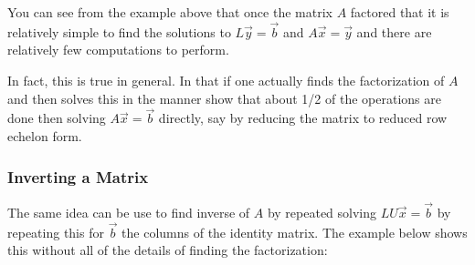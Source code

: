 You can see from the example above that once the matrix $A$ factored that it is relatively simple to find the solutions to $L\vec{y}=\vec{b}$ and $A\vec{x}=\vec{y}$ and there are relatively few computations to perform.  

In fact, this is true in general.  In that if one actually finds the factorization of $A$ and then solves this in the manner show that about 1/2 of the operations are done then solving $A\vec{x}=\vec{b}$ directly, say by reducing the matrix to reduced row echelon form.  

\subsubsection{Inverting a Matrix}

The same idea can be use to find inverse of $A$ by repeated solving $LU\vec{x} = \vec{b}$ by repeating this for $\vec{b}$ the columns of the identity matrix.   The example below shows this without all of the details of finding the factorization:

\vspace{1in}

